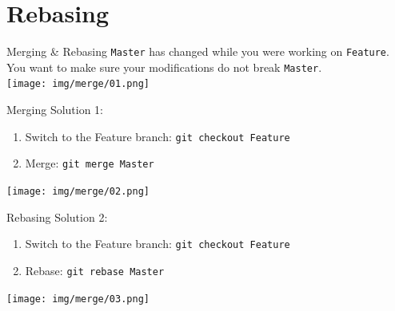 \documentclass[usenames,dvipsnames,9pt]{beamer}
\begin{document}
%
%
\section{Rebasing}

%
\begin{frame}{Merging \& Rebasing}
  \texttt{Master} has changed while you were working on \texttt{Feature}.\\
  You want to make sure your modifications do not break \texttt{Master}.\\
  \vspace{0.37cm}
  \texttt{[image: img/merge/01.png]}
\end{frame}

%
\begin{frame}{Merging}
  Solution 1:
  \begin{enumerate}
    \item Switch to the Feature branch: \lstinline|git checkout Feature|
    \item Merge: \lstinline|git merge Master|
  \end{enumerate}
  \texttt{[image: img/merge/02.png]}
\end{frame}

%
\begin{frame}{Rebasing}
  Solution 2:
  \begin{enumerate}
    \item Switch to the Feature branch: \lstinline|git checkout Feature|
    \item Rebase: \lstinline|git rebase Master|
  \end{enumerate}
  \texttt{[image: img/merge/03.png]}
  \vspace{-0.06cm}
\end{frame}
\end{document}
